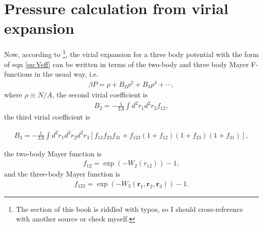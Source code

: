 \documentclass[twocolumn,amsmath,amssymb,aps]{revtex4-1}%
\begin{document}
\section{Pressure calculation from virial expansion}
Now, according to \cite{LEE198895}
\footnote{The section of this book is riddled with
  typos, so I should cross-reference with another source or check myself.},
the virial expansion for a three body potential with the form of eqn
\ref{eq:Veff} can be written in terms of the two-body and three body
Mayer F-functions in the usual way, i.e.
\begin{align}
  \beta P = \rho + B_2\rho^2 +B_3\rho^3+\cdots,
\end{align}
where $\rho\equiv N/A$, the second virial coefficient is
\begin{align}\label{eq:B2}
  B_2=-\frac{1}{2A}\int d^2r_1 d^2r_2 f_{12},
\end{align}
the third virial coefficient is
\begin{widetext}
  \begin{align}\label{eq:B3}
    B_3=-\frac{1}{3A}\int d^2r_1 d^2r_2 d^2r_3
    [f_{12}f_{23}f_{31}+f_{123}(1+f_{12})(1+f_{23})(1+f_{31})],
  \end{align}
  \end{widetext}
the two-body Mayer function is
\begin{align}\label{eq:f12}
  f_{12} = \exp(-W_2(r_{12}))-1,
\end{align}
and the three-body Mayer function is
\begin{align}\label{eq:f13}
  f_{123} = \exp(-W_3(\bm{r}_1,\bm{r}_2,\bm{r}_3))-1.
\end{align}




\end{document}
